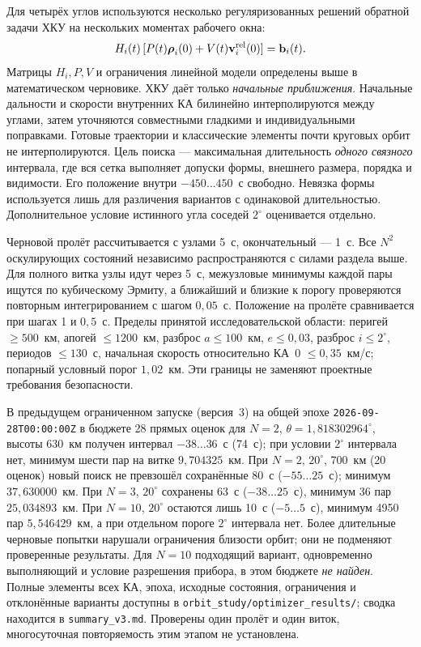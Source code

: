 \documentclass[a4paper,12pt]{article}
\begin{document}
Для четырёх углов используются несколько регуляризованных решений
обратной задачи ХКУ на нескольких моментах рабочего окна:
\begin{equation}
 H_i(t)\,[P(t)\boldsymbol\rho_i(0)+V(t)\mathbf v_i^{\rm rel}(0)]
 =\mathbf b_i(t).
\end{equation}
Матрицы $H_i,P,V$ и ограничения линейной модели определены выше в
математическом черновике. ХКУ даёт только \emph{начальные приближения}.
Начальные дальности и скорости внутренних КА билинейно интерполируются
между углами, затем уточняются совместными гладкими и индивидуальными
поправками. Готовые траектории и классические элементы почти круговых
орбит не интерполируются. Цель поиска --- максимальная длительность
\emph{одного связного} интервала, где вся сетка выполняет допуски
формы, внешнего размера, порядка и видимости. Его положение внутри
$-450\ldots450$~с свободно. Невязка формы используется лишь для
различения вариантов с одинаковой длительностью. Дополнительное
условие истинного угла соседей $2^\circ$ оценивается отдельно.

Черновой пролёт рассчитывается с узлами 5~с, окончательный --- 1~с.
Все $N^2$ оскулирующих состояний независимо распространяются с силами
раздела выше. Для полного витка узлы идут через 5~с, межузловые
минимумы каждой пары ищутся по кубическому Эрмиту, а ближайший и
близкие к порогу проверяются повторным интегрированием с шагом
$0{,}05$~с. Положение на пролёте сравнивается при шагах 1 и
$0{,}5$~с. Пределы принятой исследовательской области: перигей
$\geq500$~км, апогей $\leq1200$~км, разброс $a\leq100$~км,
$e\leq0{,}03$, разброс $i\leq2^\circ$, периодов $\leq130$~с,
начальная скорость относительно КА~0 $\leq0{,}35$~км/с;
попарный условный порог $1{,}02$~км. Эти границы не заменяют
проектные требования безопасности.

В предыдущем ограниченном запуске (версия~3) на общей эпохе
\texttt{2026-09-28T00:00:00Z} в бюджете 28 прямых
оценок для $N=2$, $\theta=1{,}818302964^\circ$, высоты 630~км
получен интервал $-38\ldots36$~с (74~с); при условии $2^\circ$
интервала нет, минимум шести пар на витке $9{,}704325$~км.
При $N=2$, $20^\circ$, 700~км (20 оценок) новый поиск не превзошёл
сохранённые 80~с ($-55\ldots25$~с); минимум $37{,}630000$~км.
При $N=3$, $20^\circ$ сохранены 63~с ($-38\ldots25$~с), минимум
36 пар $25{,}034893$~км. При $N=10$, $20^\circ$ остаются лишь
10~с ($-5\ldots5$~с), минимум 4950 пар $5{,}546429$~км,
а при отдельном пороге $2^\circ$ интервала нет. Более длительные
черновые попытки нарушали ограничения близости орбит; они не
подменяют проверенные результаты. Для $N=10$ подходящий вариант,
одновременно выполняющий и условие разрешения прибора, в этом
бюджете \emph{не найден}. Полные элементы всех КА, эпоха,
исходные состояния, ограничения и отклонённые варианты доступны в
\texttt{orbit\_study/optimizer\_results/}; сводка находится в
\texttt{summary\_v3.md}. Проверены один пролёт и один виток,
многосуточная повторяемость этим этапом не установлена.
\end{document}
